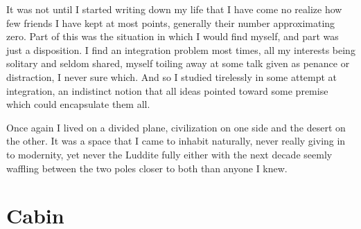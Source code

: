 \documentclass[ebook, 10pt, openright, onecolumn]{memoir}
\begin{document}
It was not until I started writing down my life that I have come no realize how
few friends I have kept at most points, generally their number approximating
zero.  Part of this was the situation in which I would find myself, and part was
just a disposition.  I find an integration problem most times, all my interests
being solitary and seldom shared, myself toiling away at some talk given as
penance or distraction, I never sure which.  And so I studied tirelessly in some
attempt at integration, an indistinct notion that all ideas pointed toward some
premise which could encapsulate them all. 

Once again I lived on a divided plane, civilization on one side and the desert
on the other.  It was a space that I came to inhabit naturally, never really
giving in to modernity, yet never the Luddite fully either with the next decade
seemly waffling between the two poles closer to both than anyone I knew.  



\chapter{Cabin}
\label{cha:cabin}
\end{document}
